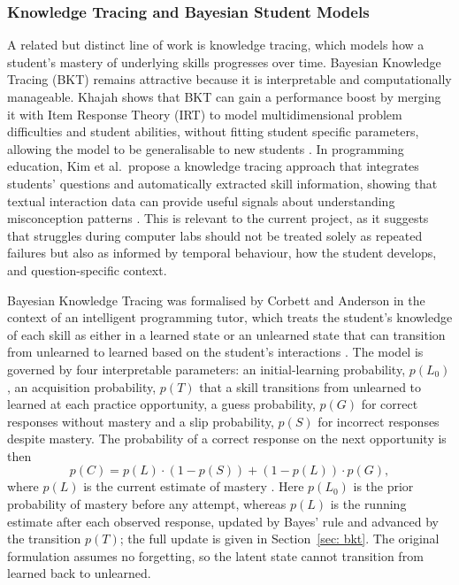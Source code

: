 \subsubsection{Knowledge Tracing and Bayesian Student Models}
A related but distinct line of work is knowledge tracing, which models how a student's mastery of underlying skills progresses over time.
Bayesian Knowledge Tracing (BKT) remains attractive because it is interpretable and computationally manageable.
Khajah shows that BKT can gain a performance boost by merging it with Item Response Theory (IRT) to model multidimensional problem difficulties and student abilities, without fitting student specific parameters, allowing the model to be generalisable to new students \cite{khajah_supercharging}.
In programming education, Kim et al.\ propose a knowledge tracing approach that integrates students' questions and automatically extracted skill information, showing that textual interaction data can provide useful signals about understanding misconception patterns \cite{kim_knowledge}.
This is relevant to the current project, as it suggests that struggles during computer labs should not be treated solely as repeated failures but also as informed by temporal behaviour, how the student develops, and question-specific context.  

Bayesian Knowledge Tracing was formalised by Corbett and Anderson in the context of an intelligent programming tutor, which treats the student's knowledge of each skill as either in a learned state or an unlearned state that can transition from unlearned to learned based on the student's interactions \cite{corbettKnowledgeTracingModeling1995}.
The model is governed by four interpretable parameters: an initial-learning probability, $p(L_0)$, an acquisition probability, $p(T)$ that a skill transitions from unlearned to learned at each practice opportunity, a guess probability, $p(G)$ for correct responses without mastery and a slip probability, $p(S)$ for incorrect responses despite mastery. The probability of a correct response on the next opportunity is then 
\begin{equation}
    p(C) = p(L) \cdot (1 - p(S)) + (1 - p(L)) \cdot p(G),
    \label{eq:bkt-prediction}
\end{equation} 
where $p(L)$ is the current estimate of mastery \cite{corbettKnowledgeTracingModeling1995}.
Here $p(L_0)$ is the prior probability of mastery before any attempt, whereas $p(L)$ is the running estimate after each observed response, updated by Bayes' rule and advanced by the transition $p(T)$; the full update is given in Section~\ref{sec: bkt}.
The original formulation assumes no forgetting, so the latent state cannot transition from learned back to unlearned.

